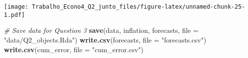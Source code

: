 \documentclass[
]{article}
\newenvironment{Shaded}{\begin{snugshade}}{\end{snugshade}}
\newcommand{\AttributeTok}[1]{\textcolor[rgb]{0.13,0.29,0.53}{#1}}
\newcommand{\CommentTok}[1]{\textcolor[rgb]{0.56,0.35,0.01}{\textit{#1}}}
\newcommand{\FunctionTok}[1]{\textcolor[rgb]{0.13,0.29,0.53}{\textbf{#1}}}
\newcommand{\NormalTok}[1]{#1}
\newcommand{\StringTok}[1]{\textcolor[rgb]{0.31,0.60,0.02}{#1}}
\begin{document}
\texttt{[image: Trabalho\_Econo4\_Q2\_junto\_files/figure-latex/unnamed-chunk-25-1.pdf]}

\begin{Shaded}
\begin{Highlighting}[]
\CommentTok{\# Save data for Question 3}
\FunctionTok{save}\NormalTok{(data, inflation, forecasts, }\AttributeTok{file =} \StringTok{"data/Q2\_objects.Rda"}\NormalTok{)}
\FunctionTok{write.csv}\NormalTok{(forecasts, }\AttributeTok{file =} \StringTok{"forecasts.csv"}\NormalTok{)}
\FunctionTok{write.csv}\NormalTok{(cum\_error, }\AttributeTok{file =} \StringTok{"cum\_error.csv"}\NormalTok{)}
\end{Highlighting}
\end{Shaded}
\end{document}
